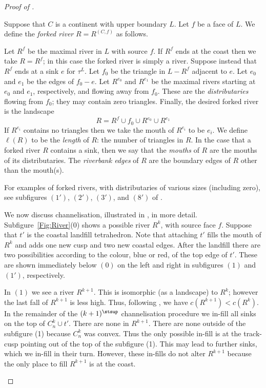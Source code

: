 \documentclass[12pt]{amsart}
\begin{document}
\begin{proof}[Proof of ]
\begin{definition}
\label{Def:Forked}
Suppose that $C$ is a continent with upper boundary $L$.  Let $f$ be a face of $L$.  We define the \emph{forked river} $R = R^{(C, f)}$ as follows. 

Let $R^f$ be the maximal river in $L$ with source $f$.  If $R^f$ ends at the coast then we take $R = R^f$; in this case the forked river is simply a river.  Suppose instead that $R^f$ ends at a sink $e$ for $\tau^L$.  Let $f_0$ be the triangle in $L - R^f$ adjacent to $e$.  Let $e_0$ and $e_1$ be the edges of $f_0 - e$.  Let $R^{e_0}$ and $R^{e_1}$ be the maximal rivers starting at $e_0$ and $e_1$, respectively, and flowing away from $f_0$.  These are the \emph{distributaries} flowing from $f_0$; they may contain zero triangles.  Finally, the desired forked river is the landscape 
\[
R = R^f \cup f_0 \cup R^{e_0} \cup R^{e_1}
\]
If $R^{e_i}$ contains no triangles then we take the mouth of $R^{e_i}$ to be $e_i$.   We define $\ell(R)$ to be the \emph{length} of $R$: the number of triangles in $R$.  In the case that a forked river $R$ contains a sink, then we say that the \emph{mouths} of $R$ are the mouths of its distributaries.   The \emph{riverbank edges} of $R$ are the boundary edges of $R$ other than the mouth(s).
\end{definition}

For examples of forked rivers, with distributaries of various sizes (including zero), see subfigures $(1')$, $(2')$, $(3')$, and $(8')$ of .  

\begin{example}
\label{Exa:RiversSimplify}
We now discuss channelisation, illustrated in , in more detail.  Subfigure~\ref{Fig:River}(0) shows a possible river $R^k$, with source face $f$.  Suppose that $t'$ is the coastal landfill tetrahedron.  Note that attaching $t'$ fills the mouth of $R^k$ and adds one new cusp and two new coastal edges.  After the landfill there are two possibilities according to the colour, blue or red, of the top edge of $t'$.  These are shown immediately below $(0)$ on the left and right in subfigures $(1)$ and $(1')$, respectively.

In $(1)$ we see a river $R^{k+1}$.  This is isomorphic (as a landscape) to $R^k$; however the last fall of $R^{k+1}$ is less high.  Thus, following , we have $c(R^{k+1}) < c(R^k)$.  In the remainder of the $(k+1)^\stsup$ channelisation procedure we in-fill all sinks on the top of $C_n^k \cup t'$.  There are none in $R^{k+1}$.  There are none outside of the subfigure (1) because $C_n^k$ was convex.  Thus the only possible in-fill is at the track-cusp pointing out of the top of the subfigure (1).  This may lead to further sinks, which we in-fill in their turn.  However, these in-fills do not alter $R^{k+1}$ because the only place to fill $R^{k+1}$ is at the coast.  


\end{example}
\end{proof}
\end{document}
